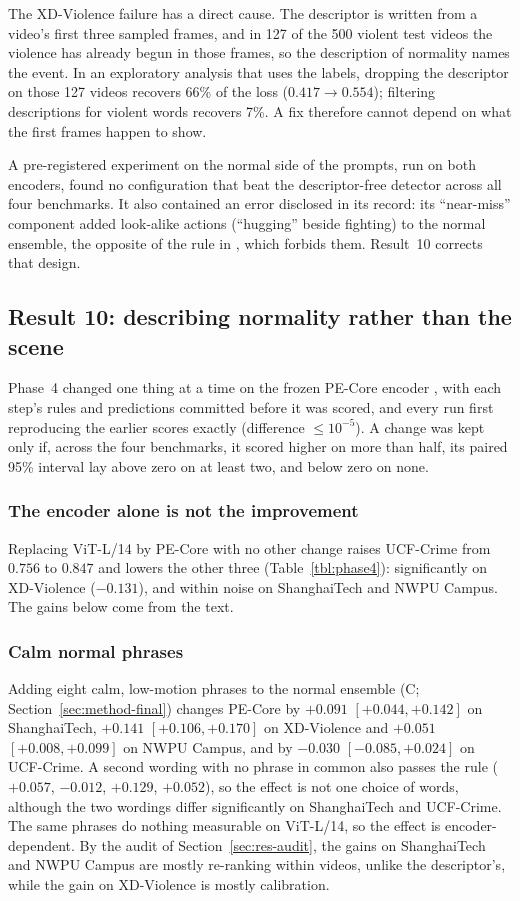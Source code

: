 \documentclass[a4paper,fleqn]{cas-sc}
\begin{document}
The XD-Violence failure has a direct cause. The descriptor is written from a
video's first three sampled frames, and in 127 of the 500 violent test videos the
violence has already begun in those frames, so the description of normality names
the event. In an exploratory analysis that uses the labels, dropping the descriptor
on those 127 videos recovers 66\% of the loss ($0.417 \to 0.554$); filtering
descriptions for violent words recovers 7\%. A fix therefore cannot depend on what
the first frames happen to show.

A pre-registered experiment on the normal side of the prompts, run on both
encoders, found no configuration that beat the descriptor-free detector across all
four benchmarks. It also contained an error disclosed in its record: its
``near-miss'' component added look-alike actions (``hugging'' beside fighting) to
the normal ensemble, the opposite of the rule in \citet{yin2026nova}, which forbids
them. Result~10 corrects that design.

\subsection{Result 10: describing normality rather than the scene}
\label{sec:res-final}
Phase~4 changed one thing at a time on the frozen PE-Core encoder
\citep{bolya2025pe}, with each step's rules and predictions committed before it
was scored, and every run first reproducing the earlier scores exactly
(difference $\le 10^{-5}$). A change was kept only if, across the four benchmarks,
it scored higher on more than half, its paired 95\% interval lay above zero on at
least two, and below zero on none.

\subsubsection{The encoder alone is not the improvement}
Replacing ViT-L/14 by PE-Core with no other change raises UCF-Crime from $0.756$
to $0.847$ and lowers the other three (Table~\ref{tbl:phase4}): significantly on
XD-Violence ($-0.131$), and within noise on ShanghaiTech and NWPU Campus. The gains
below come from the text.

\subsubsection{Calm normal phrases}
Adding eight calm, low-motion phrases to the normal ensemble (C;
Section~\ref{sec:method-final}) changes PE-Core by $+0.091$ $[+0.044, +0.142]$ on
ShanghaiTech, $+0.141$ $[+0.106, +0.170]$ on XD-Violence and $+0.051$
$[+0.008, +0.099]$ on NWPU Campus, and by $-0.030$ $[-0.085, +0.024]$ on
UCF-Crime. A second wording with no phrase in common also passes the rule
($+0.057$, $-0.012$, $+0.129$, $+0.052$), so the effect is not one choice of
words, although the two wordings differ significantly on ShanghaiTech and
UCF-Crime. The same phrases do nothing measurable on ViT-L/14, so the effect is
encoder-dependent. By the audit of Section~\ref{sec:res-audit}, the gains on
ShanghaiTech and NWPU Campus are mostly re-ranking within videos, unlike the
descriptor's, while the gain on XD-Violence is mostly calibration.
\end{document}
